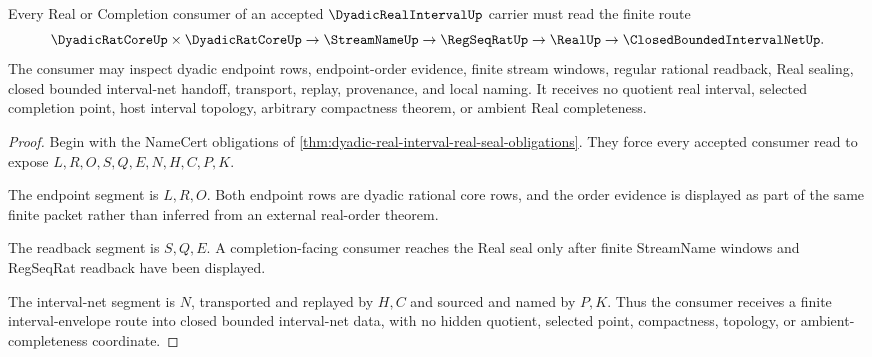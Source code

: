 \begin{theorem}
\label{thm:dyadic-real-interval-completion-consumer-route}
Every Real or Completion consumer of an accepted $\DyadicRealIntervalUp$ carrier must read the finite route
$$
\DyadicRatCoreUp \times \DyadicRatCoreUp \to \StreamNameUp \to \RegSeqRatUp \to \RealUp \to \ClosedBoundedIntervalNetUp .
$$
The consumer may inspect dyadic endpoint rows, endpoint-order evidence, finite stream windows, regular rational readback, Real sealing, closed bounded interval-net handoff, transport, replay, provenance, and local naming. It receives no quotient real interval, selected completion point, host interval topology, arbitrary compactness theorem, or ambient Real completeness.
\end{theorem}
\begin{proof}
Begin with the NameCert obligations of \autoref{thm:dyadic-real-interval-real-seal-obligations}. They force every accepted consumer read to expose $L,R,O,S,Q,E,N,H,C,P,K$.

The endpoint segment is $L,R,O$. Both endpoint rows are dyadic rational core rows, and the order evidence is displayed as part of the same finite packet rather than inferred from an external real-order theorem.

The readback segment is $S,Q,E$. A completion-facing consumer reaches the Real seal only after finite StreamName windows and RegSeqRat readback have been displayed.

The interval-net segment is $N$, transported and replayed by $H,C$ and sourced and named by $P,K$. Thus the consumer receives a finite interval-envelope route into closed bounded interval-net data, with no hidden quotient, selected point, compactness, topology, or ambient-completeness coordinate.
\end{proof}



